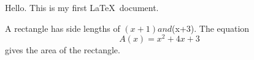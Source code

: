 \documentclass[11pt]{article}
\begin{document}
Hello. This is my first \LaTeX\ document.

A rectangle has side lengths of $(x+1) and $(x+3). 
The equation $${A(x)= x^2+4x+3}$$ gives the area of the rectangle. 
\end{document}
